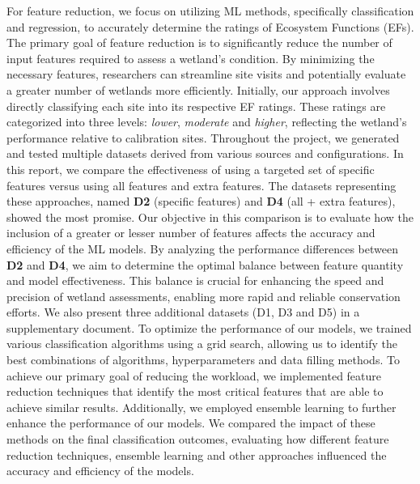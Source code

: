 \documentclass[12pt,letterpaper]{article}
\begin{document}
For feature reduction, we focus on utilizing \ac{ML} methods, specifically classification and regression, to accurately determine the ratings of Ecosystem Functions (\acp{EF}).
The primary goal of feature reduction is to significantly reduce the number of input features required to assess a wetland's condition.
By minimizing the necessary features, researchers can streamline site visits and potentially evaluate a greater number of wetlands more efficiently.
Initially, our approach involves directly classifying each site into its respective \ac{EF} ratings.
These ratings are categorized into three levels: \textit{lower}, \textit{moderate} and \textit{higher}, reflecting the wetland's performance relative to calibration sites.
Throughout the project, we generated and tested multiple datasets derived from various sources and configurations.
In this report, we compare the effectiveness of using a targeted set of specific features versus using all features and extra features.
The datasets representing these approaches, named \textbf{D2} (specific features) and \textbf{D4} (all + extra features), showed the most promise.
Our objective in this comparison is to evaluate how the inclusion of a greater or lesser number of features affects the accuracy and efficiency of the \ac{ML} models.
By analyzing the performance differences between \textbf{D2} and \textbf{D4}, we aim to determine the optimal balance between feature quantity and model effectiveness.
This balance is crucial for enhancing the speed and precision of wetland assessments, enabling more rapid and reliable conservation efforts.
We also present three additional datasets (D1, D3 and D5) in a supplementary document.
To optimize the performance of our models, we trained various classification algorithms using a grid search, allowing us to identify the best combinations of algorithms, hyperparameters and data filling methods.
To achieve our primary goal of reducing the workload, we implemented feature reduction techniques that identify the most critical features that are able to achieve similar results.
Additionally, we employed ensemble learning to further enhance the performance of our models.
We compared the impact of these methods on the final classification outcomes, evaluating how different feature reduction techniques, ensemble learning and other approaches influenced the accuracy and efficiency of the models.
\end{document}
